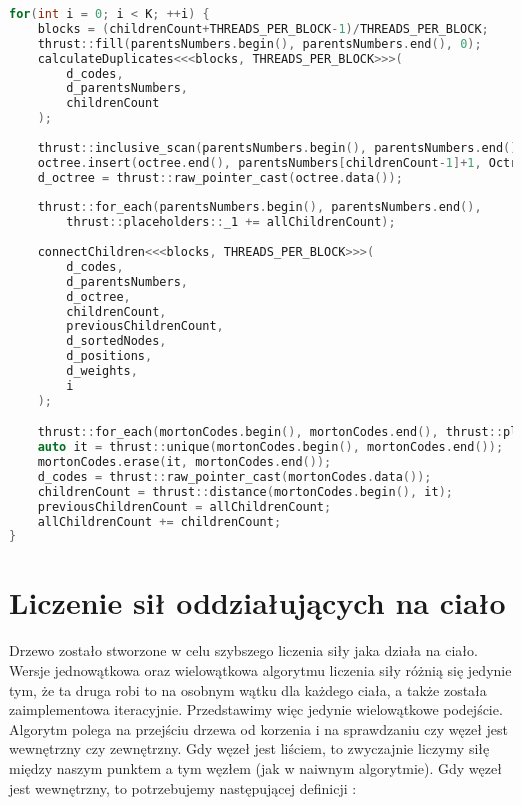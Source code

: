 \documentclass[14pt,twoside,a4paper]{article}
\theoremstyle{definition}
\begin{document}
\begin{lstlisting}[language=C++, frame=single, framerule=2pt, caption=Kroki 5-6]
for(int i = 0; i < K; ++i) {
    blocks = (childrenCount+THREADS_PER_BLOCK-1)/THREADS_PER_BLOCK;
    thrust::fill(parentsNumbers.begin(), parentsNumbers.end(), 0);
    calculateDuplicates<<<blocks, THREADS_PER_BLOCK>>>(
        d_codes,
        d_parentsNumbers,
        childrenCount
    );
        
    thrust::inclusive_scan(parentsNumbers.begin(), parentsNumbers.end(), parentsNumbers.begin());
    octree.insert(octree.end(), parentsNumbers[childrenCount-1]+1, OctreeNode());
    d_octree = thrust::raw_pointer_cast(octree.data());
        
    thrust::for_each(parentsNumbers.begin(), parentsNumbers.end(),
    	thrust::placeholders::_1 += allChildrenCount);
        
    connectChildren<<<blocks, THREADS_PER_BLOCK>>>(
        d_codes,
        d_parentsNumbers,
        d_octree,
        childrenCount,
        previousChildrenCount,
        d_sortedNodes,
        d_positions,
        d_weights,
        i
    );

    thrust::for_each(mortonCodes.begin(), mortonCodes.end(), thrust::placeholders::_1 >>= 3);        
    auto it = thrust::unique(mortonCodes.begin(), mortonCodes.end());
    mortonCodes.erase(it, mortonCodes.end());
    d_codes = thrust::raw_pointer_cast(mortonCodes.data()); 
    childrenCount = thrust::distance(mortonCodes.begin(), it);
    previousChildrenCount = allChildrenCount;
    allChildrenCount += childrenCount;
}
\end{lstlisting}

\section{\LARGE Liczenie sił oddziałujących na ciało}

Drzewo zostało stworzone w celu szybszego liczenia siły jaka działa na ciało.\\
Wersje jednowątkowa oraz wielowątkowa algorytmu liczenia siły różnią się jedynie tym, że ta druga robi to na osobnym wątku dla każdego ciała, a także została zaimplementowa iteracyjnie. Przedstawimy więc jedynie wielowątkowe podejście. \\
Algorytm polega na przejściu drzewa od korzenia i na sprawdzaniu czy węzeł jest wewnętrzny czy zewnętrzny. Gdy węzeł jest liściem, to zwyczajnie liczymy siłę między naszym punktem a tym węzłem (jak w naiwnym algorytmie). Gdy węzeł jest wewnętrzny, to potrzebujemy następującej definicji \cite{Aarseth}:
\end{document}
